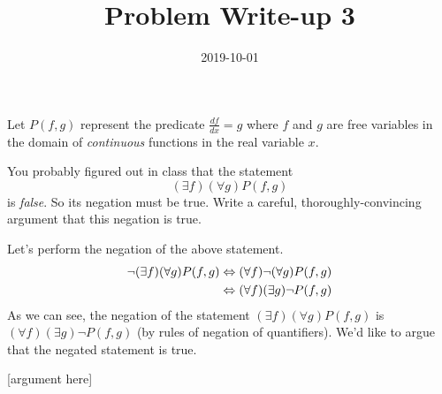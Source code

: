 \documentclass[a4paper,12pt]{article}
\title{Problem Write-up 3}
\date{2019-10-01}
\begin{document}
    \begin{problem}
        Let \(P(f,g)\) represent the predicate \(\frac{df}{dx} = g\) where \(f\) and \(g\) are free variables in the domain of \textit{continuous} functions in the real variable \(x\).

        You probably figured out in class that the statement \[(\exists f)(\forall g) P(f,g)\] is \textit{false}. So its negation must be true. Write a careful, thoroughly-convincing argument that this negation is true.

    \end{problem}
    \begin{answer}
        Let's perform the negation of the above statement.
        \begin{align*}
            \neg (\exists f)(\forall g) P(f,g) &\Leftrightarrow (\forall f) \neg (\forall g) P(f,g) \\
            &\Leftrightarrow (\forall f) (\exists g) \neg P(f,g)
        \end{align*}
        As we can see, the negation of the statement \((\exists f)(\forall g) P(f,g)\) is \((\forall f) (\exists g) \neg P(f,g)\) (by rules of negation of quantifiers). We'd like to argue that the negated statement is true.

        [argument here]
    \end{answer}
\end{document}
